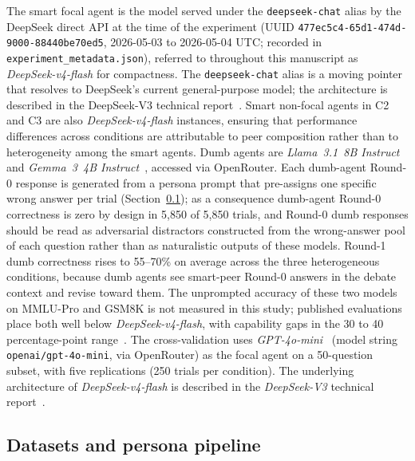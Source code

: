 \documentclass[review,3p,authoryear]{elsarticle}
\begin{document}
The smart focal agent is the model served under the
\texttt{deepseek-chat} alias by the DeepSeek direct API at the time of
the experiment (UUID
\texttt{477ec5c4-65d1-474d-9000-88440be70ed5}, 2026-05-03 to
2026-05-04 UTC; recorded in
\texttt{experiment\_metadata.json}), referred to throughout this
manuscript as \textit{DeepSeek-v4-flash} for compactness.
The \texttt{deepseek-chat} alias is a moving pointer that resolves to
DeepSeek's current general-purpose model; the architecture is
described in the DeepSeek-V3 technical
report~\citep{deepseekai2024v3}.
Smart non-focal agents in C2 and C3 are also \textit{DeepSeek-v4-flash}
instances, ensuring that performance differences across conditions are
attributable to peer composition rather than to heterogeneity among the
smart agents.
Dumb agents are \textit{Llama~3.1~8B Instruct}~\citep{meta2024llama3}
and \textit{Gemma~3~4B Instruct}~\citep{gemma2025technical}, accessed via
OpenRouter.
Each dumb-agent Round-0 response is generated from a persona prompt that
pre-assigns one specific wrong answer per trial
(Section~\ref{sub:data}); as a consequence dumb-agent Round-0
correctness is zero by design in 5{,}850 of 5{,}850 trials, and
Round-0 dumb responses should be read as adversarial distractors
constructed from the wrong-answer pool of each question rather than as
naturalistic outputs of these models.
Round-1 dumb correctness rises to 55--70\% on average across the three
heterogeneous conditions, because dumb agents see smart-peer Round-0
answers in the debate context and revise toward them.
The unprompted accuracy of these two models on MMLU-Pro and GSM8K is
not measured in this study; published evaluations place both well below
\textit{DeepSeek-v4-flash}, with capability gaps in the 30 to 40
percentage-point range~\citep{meta2024llama3,gemma2025technical}.
The cross-validation uses \textit{GPT-4o-mini}~\citep{openai2024gpt4o}
(model string \texttt{openai/gpt-4o-mini}, via OpenRouter) as the focal
agent on a 50-question subset, with five replications (250 trials per
condition).
The underlying architecture of \textit{DeepSeek-v4-flash} is described in
the \textit{DeepSeek-V3} technical report~\citep{deepseekai2024v3}.

\subsection{Datasets and persona pipeline}
\label{sub:data}
\end{document}
